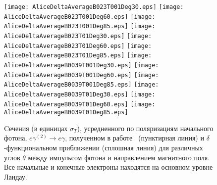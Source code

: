 \begin{figure}[t!]\centering
	\texttt{[image: AliceDeltaAverageB023T001Deg30.eps]}
	\texttt{[image: AliceDeltaAverageB023T001Deg60.eps]}
	\texttt{[image: AliceDeltaAverageB023T001Deg85.eps]}
	\texttt{[image: AliceDeltaAverageB023T01Deg30.eps]}
	\texttt{[image: AliceDeltaAverageB023T01Deg60.eps]}
	\texttt{[image: AliceDeltaAverageB023T01Deg85.eps]}
	\texttt{[image: AliceDeltaAverageB0039T001Deg30.eps]}
	\texttt{[image: AliceDeltaAverageB0039T001Deg60.eps]}
	\texttt{[image: AliceDeltaAverageB0039T001Deg85.eps]}
	\texttt{[image: AliceDeltaAverageB0039T01Deg30.eps]}
	\texttt{[image: AliceDeltaAverageB0039T01Deg60.eps]}
	\texttt{[image: AliceDeltaAverageB0039T01Deg85.eps]}	
	\caption{Cечения (в единицах $\sigma_T$), усредненного по поляризациям начального фотона, $e\gamma^{(2)}  \to e\gamma$, полученном в работе~\cite{Harding:1991} (пунктирная линия) и $\delta$-функциональном приближении (сплошная линия) для различных углов $\theta$ между импульсом фотона и направлением магнитного поля. Все начальные и конечные электроны находятся на основном уровне Ландау.}
	\label{fig:CompAndHardO}
\end{figure}
\clearpage
